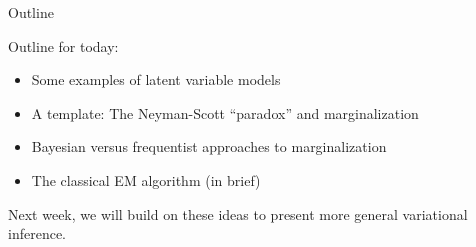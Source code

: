 
\begin{frame}{Outline}

Outline for today:

\begin{itemize}
    \item Some examples of latent variable models
    \item A template: The Neyman-Scott ``paradox'' and marginalization
    \item Bayesian versus frequentist approaches to marginalization
    \item The classical EM algorithm (in brief)
\end{itemize}

Next week, we will build on these ideas to present more general variational
inference.

\end{frame}



